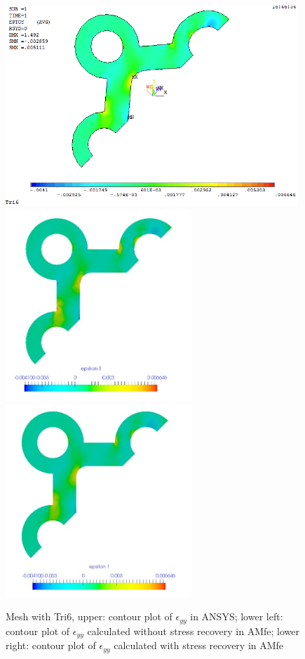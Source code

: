 \begin{figure}[htbp]
	\begin{center}
		\includegraphics[width=11cm,clip]{Tri6_Eyy.png} 
		\includegraphics[width=7cm,clip]{Tri6_Eyy_PD.png} 		
		\includegraphics[width=7cm,clip]{Tri6_Eyy_P.png} 		
		\caption{Mesh with Tri6, upper: contour plot of $\epsilon_{yy}$ in ANSYS; lower left: contour plot of $\epsilon_{yy}$ calculated without stress recovery in AMfe; lower right: contour plot of $\epsilon_{yy}$ calculated with stress recovery in AMfe} \label{fig: Tri6_Eyy}
	\end{center}
\end{figure}
\clearpage 

